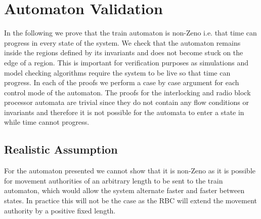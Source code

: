\section{Automaton Validation}
In the following we prove that the train automaton is non-Zeno i.e. that time can progress in every state of the system. We check that the automaton remains inside the regions defined by its invariants and does not become stuck on the edge of a region. This is important for verification purposes as simulations and model checking algorithms require the system to be live so that time can progress. In each of the proofs we perform a case by case argument for each control mode of the automaton. The proofs for the interlocking and radio block processor  automata are trivial since they do not contain any flow conditions or invariants and therefore it is not possible for the automata to enter a state in while time cannot progress.
\medskip
\subsection{Realistic Assumption}
For the automaton presented we cannot show that it  is non-Zeno as it is possible for movement authorities of an arbitrary length to be sent to the train automaton, which would allow the system alternate faster and faster between states. In practice this will not be the case as the RBC will extend the movement authority by a positive fixed length. 

